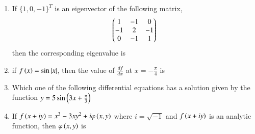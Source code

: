 \documentclass[journal,12pt,onecolumn]{IEEEtran}
\theoremstyle{remark}
\begin{document}
\begin{enumerate}
\item If $\{1, 0, -1\}^T$ is an eigenvector of the following matrix,
$$ \begin{pmatrix}1 & -1 & 0 \\ -1 & 2 & -1 \\ 0 & -1 & 1\end{pmatrix} $$
then the corresponding eigenvalue is
\hfill{}
\begin{enumerate}
\end{enumerate}

\item if $f\left(x\right) = \sin\left\vert x\right\vert$, then the value of $\frac{df}{dx}$ at $x = -\frac{\pi}{4}$ is
\hfill{}
\begin{enumerate}
\end{enumerate}

\item Which one of the following differential equations has a solution given by the function $y = 5 \sin\left(3x + \frac{\pi}{3}\right)$
\hfill{}
\begin{enumerate}
\end{enumerate}

\item If $f\left(x+iy\right) = x^3 - 3xy^2 + i \varphi\left(x,y\right)$ where $i = \sqrt{-1}$ and $f\left(x+iy\right)$ is an analytic function, then $\varphi\left(x,y\right)$ is
\hfill{}
\begin{enumerate}
\end{enumerate}


\end{enumerate}
\end{document}

